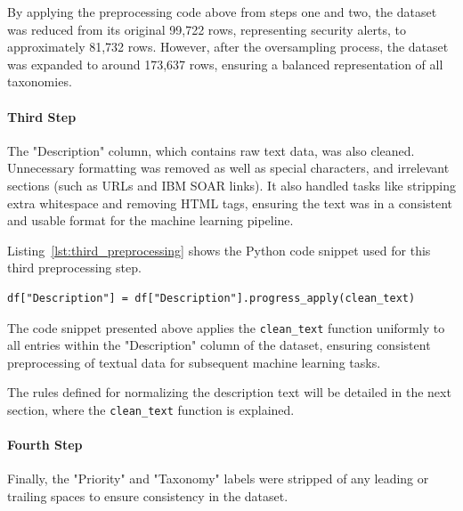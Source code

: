 By applying the preprocessing code above from steps one and two, the dataset was reduced from its original 99,722 rows, representing security alerts, to approximately 81,732 rows.
However, after the oversampling process, the dataset was expanded to around 173,637 rows, ensuring a balanced representation of all taxonomies.

\paragraph{Third Step}

The "Description" column, which contains raw text data, was also cleaned. 
Unnecessary formatting was removed as well as special characters, and irrelevant sections (such as URLs and IBM SOAR links). 
It also handled tasks like stripping extra whitespace and removing HTML tags, ensuring the text was in a consistent and usable format for the machine learning pipeline.

Listing~\ref{lst:third_preprocessing} shows the Python code snippet used for this third preprocessing step.

\vspace{0.2cm}
\noindent
\begin{minipage}{\linewidth}
\begin{verbatim}
df["Description"] = df["Description"].progress_apply(clean_text)
\end{verbatim}
\label{lst:third_preprocessing}
\end{minipage}
\vspace{0.1cm}

The code snippet presented above applies the \texttt{clean\_text} function uniformly to all entries within the "Description" column of the dataset, ensuring consistent preprocessing of textual data for subsequent machine learning tasks.

The rules defined for normalizing the description text will be detailed in the next section, where the \texttt{clean\_text} function is explained.

\paragraph{Fourth Step}

Finally, the "Priority" and "Taxonomy" labels were stripped of any leading or trailing spaces to ensure consistency in the dataset. 

